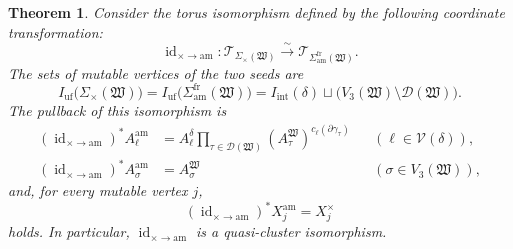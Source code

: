 \documentclass[10pt,a4paper]{article}
\newtheorem{theorem}{Theorem}[section]
\theoremstyle{definition}
\theoremstyle{remark}
\newcommand{\Tcal}{\mathcal T}
\newcommand{\Dcal}{\mathcal D}
\newcommand{\Vcal}{\mathcal V}
\newcommand{\fW}{\mathfrak W}
\newcommand{\id}{\operatorname{id}}
\begin{document}
\begin{theorem}
\label{thm:frozen-product-comparison}
Consider the torus isomorphism defined by the following coordinate
transformation:
\[
 \id_{\times\to\mathrm{am}}:
 \Tcal_{\Sigma_\times(\fW)}
 \xrightarrow{\sim}
 \Tcal_{\Sigma_{\mathrm{am}}^{\mathrm{fr}}(\fW)}.
\]
The sets of mutable vertices of the two seeds are
\begin{equation}
 I_{\mathrm{uf}}\bigl(\Sigma_\times(\fW)\bigr)
 =I_{\mathrm{uf}}\bigl(\Sigma_{\mathrm{am}}^{\mathrm{fr}}(\fW)\bigr)
 =I_{\mathrm{int}}(\delta)
  \sqcup\bigl(V_3(\fW)\setminus\Dcal(\fW)\bigr).
 \label{eq:full-product-mutable-set}
\end{equation}
The pullback of this isomorphism is
\begin{equation}
 \begin{aligned}
 (\id_{\times\to\mathrm{am}})^*A_\ell^{\mathrm{am}}
 &=A_\ell^\delta
   \prod_{\tau\in\Dcal(\fW)}
   (A_\tau^\fW)^{c_\ell(\partial\gamma_\tau)}
 &&(\ell\in\Vcal(\delta)),\\
 (\id_{\times\to\mathrm{am}})^*A_\sigma^{\mathrm{am}}
 &=A_\sigma^\fW
 &&(\sigma\in V_3(\fW)),
 \end{aligned}
 \label{eq:full-coefficient-rescaling}
\end{equation}
and, for every mutable vertex \(j\),
\begin{equation}
 (\id_{\times\to\mathrm{am}})^*X_j^{\mathrm{am}}
 =X_j^\times
 \label{eq:full-x-preservation}
\end{equation}
holds.  In particular, \(\id_{\times\to\mathrm{am}}\) is a quasi-cluster
isomorphism.
\end{theorem}
\end{document}
